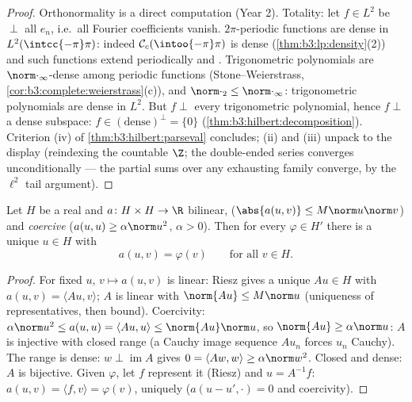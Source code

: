 \begin{proof}
Orthonormality is a direct computation (Year 2). Totality: let
$f \in L^2$ be $\perp$ all $e_n$, i.e.\ all Fourier
coefficients vanish.  $2\pi$-periodic functions are
dense in $L^2(\intcc{-\pi}\pi)$: indeed $\mathcal
C_c(\intoo{-\pi}\pi)$ is dense
(\cref{thm:b3:lp:density}(2)) and such functions extend
periodically and . Trigonometric polynomials are
$\norm\cdot_\infty$-dense among  periodic functions
(Stone--Weierstrass, \cref{cor:b3:complete:weierstrass}(c)),
and $\norm\cdot_2 \leq \norm\cdot_\infty$: trigonometric
polynomials are dense in $L^2$. But $f \perp$ every
trigonometric polynomial, hence $f \perp$ a dense subspace: $f
\in (\text{dense})^\perp = \{0\}$
(\cref{thm:b3:hilbert:decomposition}). Criterion (iv) of
\cref{thm:b3:hilbert:parseval} concludes; (ii) and (iii)
unpack to the display (reindexing the countable $\Z$; the
double-ended series converges unconditionally --- the partial
sums over any exhausting family converge, by the $\ell^2$ tail
argument).
\end{proof}

\begin{theorem}\label{thm:b3:hilbert:laxmilgram}
Let $H$ be a real  and $a \colon H\times H \to
\R$ bilinear, \emph{} ($\abs{a(u,v)} \leq M\norm
u\norm v$) and \emph{coercive} ($a(u, u) \geq \alpha\norm u^2$,
$\alpha > 0$). Then for every $\varphi \in H'$ there is a
unique $u \in H$ with
\[
a(u, v) = \varphi(v) \qquad \text{for all } v \in H .
\]
\end{theorem}

\begin{proof}
For fixed $u$, $v \mapsto a(u, v)$ is  linear: Riesz
gives a unique $Au \in H$ with $a(u,v) = \langle Au,
v\rangle$; $A$ is linear with $\norm{Au} \leq M\norm u$
(uniqueness of representatives, then bound). Coercivity:
$\alpha\norm u^2 \leq a(u,u) = \langle Au, u\rangle \leq
\norm{Au}\norm u$, so $\norm{Au} \geq \alpha\norm u$: $A$ is
injective with closed range (a Cauchy image sequence $Au_n$
forces $u_n$ Cauchy). The range is dense: $w \perp
\operatorname{im}A$ gives $0 = \langle Aw, w\rangle \geq
\alpha\norm w^2$. Closed and dense: $A$ is bijective. Given
$\varphi$, let $f$ represent it (Riesz) and $u = A^{-1}f$:
$a(u, v) = \langle f, v\rangle = \varphi(v)$, uniquely
($a(u - u', \cdot) = 0$ and coercivity).
\end{proof}

